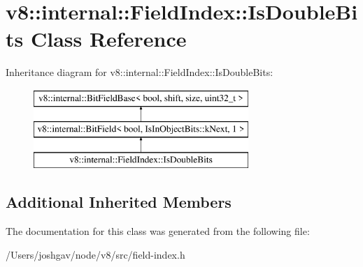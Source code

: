\hypertarget{classv8_1_1internal_1_1_field_index_1_1_is_double_bits}{}\section{v8\+:\+:internal\+:\+:Field\+Index\+:\+:Is\+Double\+Bits Class Reference}
\label{classv8_1_1internal_1_1_field_index_1_1_is_double_bits}
Inheritance diagram for v8\+:\+:internal\+:\+:Field\+Index\+:\+:Is\+Double\+Bits\+:\begin{figure}[H]
\begin{center}
\leavevmode
\includegraphics[height=3.000000cm]{classv8_1_1internal_1_1_field_index_1_1_is_double_bits}
\end{center}
\end{figure}
\subsection*{Additional Inherited Members}


The documentation for this class was generated from the following file\+:\begin{DoxyCompactItemize}
\item 
/\+Users/joshgav/node/v8/src/field-\/index.\+h\end{DoxyCompactItemize}
